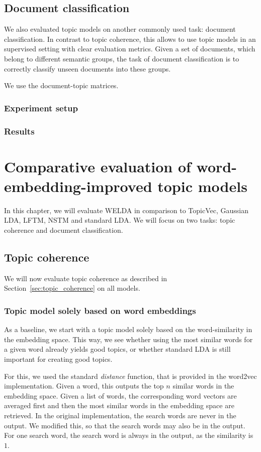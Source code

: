 \documentclass[
        a4paper,
        titlepage,
        twoside,
        parskip,
        numbers=noenddot
        ]{scrbook}
\theoremstyle{break}
\begin{document}
\section{Document classification}
We also evaluated topic models on another commonly used task: document classification.
In contrast to topic coherence, this allows to use topic models in an supervised setting with clear evaluation metrics.
Given a set of documents, which belong to different semantic groups, the task of document classification is to correctly classify unseen documents into these groups.

We use the document-topic matrices.

\subsection{Experiment setup}
\subsection{Results}


\chapter{Comparative evaluation of word-embedding-improved topic models}
\label{sec:comparative_evaluation}

In this chapter, we will evaluate WELDA in comparison to TopicVec, Gaussian LDA, LFTM, NSTM and standard LDA.
We will focus on two tasks: topic coherence and document classification.

\section{Topic coherence}
\label{sec:evaluation_topic_coherence}

We will now evaluate topic coherence as described in Section~\ref{sec:topic_coherence} on all models.

\subsection{Topic model solely based on word embeddings}
\label{sec:raw_tm_we}
As a baseline, we start with a topic model solely based on the word-similarity in the embedding space.
This way, we see whether using the most similar words for a given word already yields good topics, or whether standard LDA is still important for creating good topics.

For this, we used the standard \emph{distance} function, that is provided in the word2vec implementation.
Given a word, this outputs the top $n$ similar words in the embedding space.
Given a list of words, the corresponding word vectors are averaged first and then the most similar words in the embedding space are retrieved.
In the original implementation, the search words are never in the output.
We modified this, so that the search words may also be in the output.
For one search word, the search word is always in the output, as the similarity is $1$.
\end{document}
